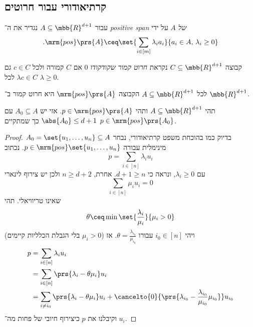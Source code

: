 \documentclass[a4paper,10pt,twoside,openany]{book}
\begin{document}
\subsection{קרתיאודורי עבור חרוטים}

\begin{definition}
עבור
$A \subseteq \mbb{R}^{d+1}$
נגדיר
את ה־%
\emph{\textenglish{positive span} של $A$}
על ידי
\begin{align*}
\text{.} \mrm{pos}\prs{A} \ceq \set{\sum_{i \in [m]} \lambda_i a_i}{a_i \in A, \, \lambda_i \geq 0}
\end{align*}
\end{definition}

\begin{definition}
קבוצה
$C \subseteq \mbb{R}^{d+1}$
נקראת
\emph{חרוט קמור שקודקודו
$0$}
אם
$C$
קמורה ולכל
$c \in C$
גם
$\lambda c \in C$
לכל
$\lambda \geq 0$.
\end{definition}

\begin{remark}
לכל
$A \subseteq \mbb{R}^{d+1}$
הקבוצה
$\mrm{pos}\prs{A}$
היא חרוט קמור ב־%
$\mbb{R}^{d+1}$.
\end{remark}

\begin{theorem}
תהי
$A \subseteq \mbb{R}^{d+1}$
ותהי
$p \in \mrm{pos}\prs{A}$.
אזי יש
$A_0 \subseteq A$
עם
$\abs{A_0} \leq d+1$
כך שמתקיים
$p \in \mrm{pos}\prs{A_0}$.
\end{theorem}

\begin{proof}
בדיוק כמו בהוכחת משפט קרתיאודורי, נבחר
$A_0 = \set{u_1, \ldots, u_n} \subseteq A$
מינימלית עבורה
$p \in \mrm{pos}\set{u_1, \ldots, u_n}$.
נכתוב
\[p = \sum_{i \in [n]} \lambda_i u_i\]
עם
$\lambda_i \geq 0$,
ונראה כי
$d+1 \geq n$.
אחרת,
$n \geq d+2$
ולכן יש צירוף לינארי
\[\sum_{i \in [n]} \mu_i u_i = 0\]
שאינו טריוויאלי.
תהי
\[\theta \ceq \min \set{\frac{\lambda_i}{\mu_i}}{\mu_i > 0}\]
(בלי הגבלת הכלליות קיימים
$\mu_i > 0$)
ויהי
$i_0 \in [n]$
עבורו
$\theta = \frac{\lambda_{i_0}}{\mu_{i_0}}$.
אז
\begin{align*}
p &= \sum_{i \in [n]} \lambda_i u_i
\\&= \sum_{i \in [n]} \prs{\lambda_i - \theta \mu_i} u_i
\\&= \sum_{i \neq i_0} \prs{\lambda_i - \theta \mu_i} u_i + \cancelto{0}{\prs{\lambda_{i_0} - \frac{\lambda_{i_0}}{\mu_{i_0}} \mu_{i_0}}} u_{i_0}
\end{align*}
וקיבלנו את
$p$
כיצירוף חיובי של פחות מה־%
$u_i$.
\end{proof}
\end{document}
